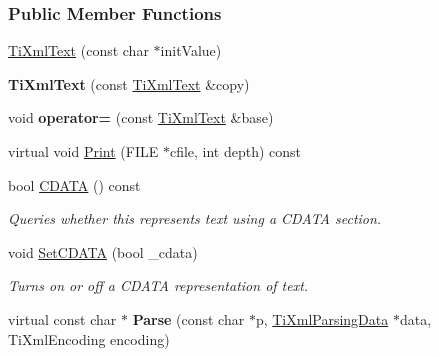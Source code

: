 \subsubsection*{Public Member Functions}
\begin{DoxyCompactItemize}
\item 
\hyperlink{class_ti_xml_text_af659e77c6b87d684827f35a8f4895960}{TiXmlText} (const char $\ast$initValue)
\item 
\hypertarget{class_ti_xml_text_a8d2cc1b4af2208cbb0171cf20f6815d1}{
{\bfseries TiXmlText} (const \hyperlink{class_ti_xml_text}{TiXmlText} \&copy)}
\label{class_ti_xml_text_a8d2cc1b4af2208cbb0171cf20f6815d1}

\item 
\hypertarget{class_ti_xml_text_af5f15d40d048cea7cab9d0eb4fd8a7d2}{
void {\bfseries operator=} (const \hyperlink{class_ti_xml_text}{TiXmlText} \&base)}
\label{class_ti_xml_text_af5f15d40d048cea7cab9d0eb4fd8a7d2}

\item 
virtual void \hyperlink{class_ti_xml_text_ae74d56c5b3ddec6cc3103dd51821af92}{Print} (FILE $\ast$cfile, int depth) const 
\item 
\hypertarget{class_ti_xml_text_ad1a6a6b83fa2271022dd97c072a2b586}{
bool \hyperlink{class_ti_xml_text_ad1a6a6b83fa2271022dd97c072a2b586}{CDATA} () const }
\label{class_ti_xml_text_ad1a6a6b83fa2271022dd97c072a2b586}

\begin{DoxyCompactList}\small\item\em Queries whether this represents text using a CDATA section. \item\end{DoxyCompactList}\item 
\hypertarget{class_ti_xml_text_acb17ff7c5d09b2c839393445a3de5ea9}{
void \hyperlink{class_ti_xml_text_acb17ff7c5d09b2c839393445a3de5ea9}{SetCDATA} (bool \_\-cdata)}
\label{class_ti_xml_text_acb17ff7c5d09b2c839393445a3de5ea9}

\begin{DoxyCompactList}\small\item\em Turns on or off a CDATA representation of text. \item\end{DoxyCompactList}\item 
\hypertarget{class_ti_xml_text_a8d2dcfa41fc73d3e62dacc2fcf633819}{
virtual const char $\ast$ {\bfseries Parse} (const char $\ast$p, \hyperlink{class_ti_xml_parsing_data}{TiXmlParsingData} $\ast$data, TiXmlEncoding encoding)}
\label{class_ti_xml_text_a8d2dcfa41fc73d3e62dacc2fcf633819}


\end{DoxyCompactItemize}
